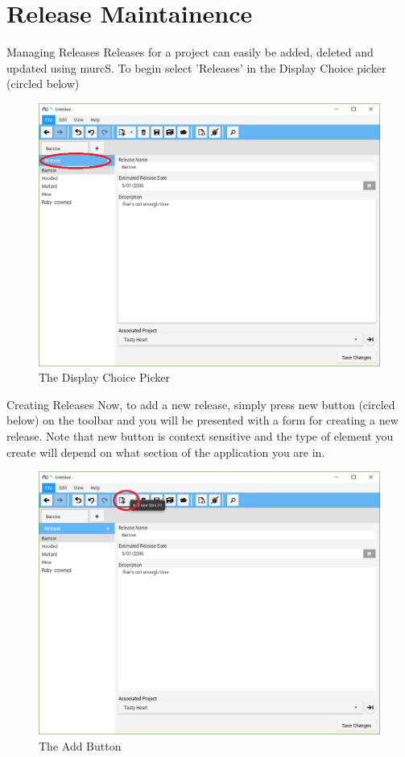 \section{Release Maintainence}

Managing Releases
\newline
Releases for a project can easily be added, deleted and updated using murcS. To begin select 'Releases' in the Display Choice picker (circled below)

\begin{figure}[H]
\centering
\includegraphics[width=\textwidth]{images/screenshots/releases1.PNG}
\caption{The Display Choice Picker}
\label{fig:new_project}
\end{figure}

Creating Releases
\newline
Now, to add a new release, simply press new button (circled below) on the toolbar and you will be presented with a form for creating a new release. Note that new button is context sensitive and the type of element you create will depend on what section of the application you are in.

\begin{figure}[H]
\centering
\includegraphics[width=\textwidth]{images/screenshots/releases2.PNG}
\caption{The Add Button}
\label{fig:new_project}
\end{figure}

